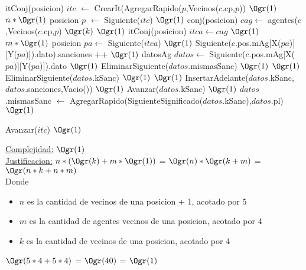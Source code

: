 \begin{Algoritmos}
\begin{algorithm}[H]
\begin{algorithmic}[1]
	\State itConj(posicion) $itc$ $\gets$ CrearIt(AgregarRapido($p$,Vecinos($c$.cp,$p$)) \Comment $\Ogr(1)$
	 \Comment $n*\Ogr(1)$
		\State posicion $p$ $\gets$ Siguiente($itc$) \Comment $\Ogr(1)$
		\State conj(posicion) $cag \gets$ agentes($c$,Vecinos($c$.cp,$p$) \Comment $\Ogr(k)$
		 \Comment $\Ogr(1)$
		\State itConj(posicion) $itca \gets cag$ \Comment $\Ogr(1)$
			 \Comment $m*\Ogr(1)$
				\State posicion $pa \gets$ Siguiente($itca$) \Comment $\Ogr(1)$
				\State Siguiente($c$.pos.mAg[X($pa$)][Y($pa$)]).dato).sanciones ++ \Comment $\Ogr(1)$
				\State datosAg $datos \gets$ Siguiente($c$.pos.mAg[X($pa$)][Y($pa$)]).dato \Comment $\Ogr(1)$
				\State EliminarSiguiente($datos$.mismasSanc) \Comment $\Ogr(1)$
				 \Comment $\Ogr(1)$
					\State EliminarSiguiente($datos$.kSanc) \Comment $\Ogr(1)$
				\EndIf
				 \Comment $\Ogr(1)$
					\State InsertarAdelante($datos$.kSanc,$datos$.sanciones,Vacio()) \Comment $\Ogr(1)$
				\Else
					\State Avanzar($datos$.kSanc) \Comment $\Ogr(1)$
				\EndIf
				\State $datos$.mismasSanc $\gets$ AgregarRapido(SiguienteSignificado($datos$.kSanc),$datos$.pl) \Comment $\Ogr(1)$
			\EndWhile
			
		\EndIf
		\State Avanzar($itc$) \Comment $\Ogr(1)$
	\EndWhile
	\EndProcedure
\end{algorithmic}
\underline{Complejidad:} $\Ogr(1)$\\
\underline{Justificacion:} $n*(\Ogr(k) + m*\Ogr(1))$ = $\Ogr(n)*\Ogr(k+m)$ = $\Ogr(n*k + n*m)$\\
Donde
\begin{itemize}
	\item $n$ es la cantidad de vecinos de una posicion + 1, acotado por 5
	\item $m$ es la cantidad de agentes vecinos de una posicion, acotado por 4
	\item $k$ es la cantidad de vecinos de una posicion, acotado por 4
\end{itemize}
$\Ogr(5*4 + 5*4)$ = $\Ogr(40)$ = $\Ogr(1)$

\end{algorithm}



\end{Algoritmos}
